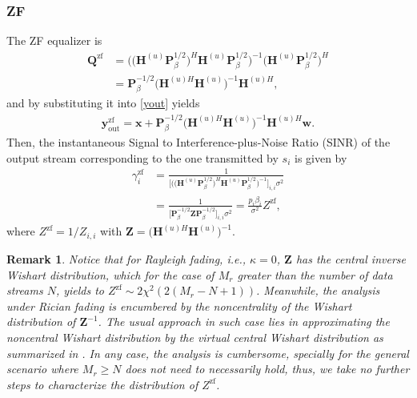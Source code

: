 \documentclass[10pt,journal,a4paper]{IEEEtran}
\newtheorem{remark}{Remark}
\begin{document}
	\subsubsection{ZF}
	The ZF equalizer is 
	\begin{align}
	\mathbf{Q}^\mathrm{zf}&=\Big(\big(\mathbf{H}^{(u)}\mathbf{P}_{\!\beta}^{1/2}\big)^H\mathbf{H}^{(u)}\mathbf{P}_{\!\beta}^{1/2}\Big)^{-1}\big(\mathbf{H}^{(u)}\mathbf{P}_{\!\beta}^{1/2}\big)^H\nonumber\\
	&=\mathbf{P}_{\!\beta}^{-1/2}\Big(\mathbf{H}^{(u)H}\mathbf{H}^{(u)}\Big)^{-1}\mathbf{H}^{(u)H},
	\end{align}
	and by substituting it into \eqref{yout} yields
	\begin{align}
	\mathbf{y}_{\mathrm{out}}^\mathrm{zf}=\mathbf{x}+\mathbf{P}_{\!\beta}^{-1/2}\Big(\mathbf{H}^{(u)H}\mathbf{H}^{(u)}\Big)^{-1}\mathbf{H}^{(u)H}\mathbf{w}.
	\end{align}
	Then, the instantaneous Signal to Interference-plus-Noise Ratio (SINR) of the output stream corresponding to the one transmitted by $s_i$ is given by %
%
	\begin{align}
	\gamma_i^\mathrm{zf}&=\frac{1}{\Big[\Big(\big(\mathbf{H}^{(u)}\mathbf{P}_{\!\beta}^{1/2}\big)^H\mathbf{H}^{(u)}\mathbf{P}_{\!\beta}^{1/2}\Big)^{-1}\Big]_{i,i}\!\sigma^2}\nonumber\\
	&=\!\frac{1}{\Big[\mathbf{P}_{\!\beta}^{-1/2}\mathbf{Z}\mathbf{P}_{\!\beta}^{-1/2}\Big]_{i,i}\!\sigma^2}\!=\!\frac{p_i\beta_i}{\sigma^2}Z^{\mathrm{zf}},\label{g1}
	\end{align}
	where $Z^{\mathrm{zf}}=1/Z_{i,i}$ with $\mathbf{Z}=\big(\mathbf{H}^{(u)H}\mathbf{H}^{(u)}\big)^{-1}$. 
	\begin{remark}\label{re5}
	Notice that for Rayleigh fading, i.e., $\kappa=0$, $\mathbf{Z}$ has the central inverse Wishart distribution, which for the case of $M_r$ greater than the number of data streams $N$, yields to $Z^\mathrm{zf}\sim 2\chi^2(2(M_r-N+1))$. Meanwhile, the analysis under Rician fading is encumbered by the noncentrality of the Wishart distribution of $\mathbf{Z}^{-1}$. The usual approach in such case lies in approximating the noncentral Wishart distribution by the virtual central Wishart distribution as summarized in \cite{Siriteanu.2012}. In any case, the analysis is cumbersome, specially for the general scenario where $M_r\ge N$ does not need to necessarily hold, thus, we take no further steps to characterize the distribution of $Z^{\mathrm{zf}}$. 
	\end{remark}
\end{document}
